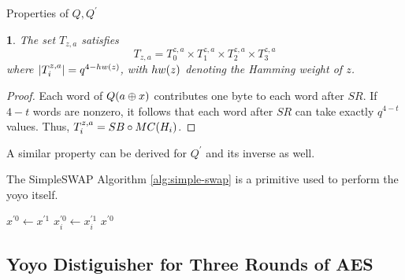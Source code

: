\documentclass[notheorems]{beamer}
\newtheorem{lemma}{\translate{Lemma}}
\theoremstyle{definition}
\theoremstyle{example}
\begin{document}
    \begin{frame}{Properties of \(Q, Q^\prime\)}
        \begin{lemma}
            \label{lem:tz-rel}
            The set \(T_{z, a}\) satisfies
            \begin{equation}
                T_{z, a} = T_0^{z, a} \times T_1^{z, a} \times T_2^{z, a} \times T_3^{z, a}
                \label{eq:tz-rel}
            \end{equation}
            where \(\left\vert T_i^{z, a}\right\vert = q^{4 - hw(z)}\), with \(hw(z)\)
            denoting the Hamming weight of \(z\).
        \end{lemma}
        \pause
        \begin{proof}
            Each word of \(Q(a \oplus x)\) contributes one byte to each
            word after \(SR\). If \(4 - t\) words are nonzero, it follows that
            each word after \(SR\) can take exactly \(q^{4 - t}\) values. Thus,
            \(T_i^{z, a} = SB \circ MC(H_i)\).
        \end{proof}
        A similar property can be derived for \(Q^\prime\) and its inverse as
        well.
    \end{frame}

    \begin{frame}{The SimpleSWAP Algorithm}
        \cref{alg:simple-swap} is a primitive used to perform the yoyo itself.
        \begin{algorithm}[H]
            \caption{Swaps the first word where texts are different and returns one word.}
            \label{alg:simple-swap}
            \begin{algorithmic}[1]
                 
                    \State \(x^{\prime 0} \gets x^{\prime 1}\)
                            \State \(x_i^{\prime 0} \gets x_i^{\prime 1}\)
                            \State \Return \(x^{\prime 0}\)
                        \EndIf
                    \EndFor
                \EndFunction
            \end{algorithmic}
        \end{algorithm}
    \end{frame}

    \subsection{Yoyo Distiguisher for Three Rounds of AES}
    \label{subsec:aes-3-rounds}
\end{document}
